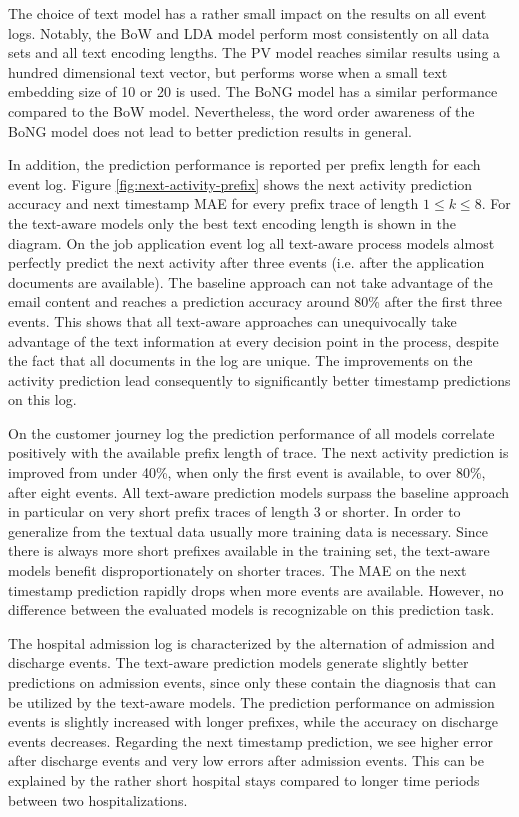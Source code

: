 The choice of text model has a rather small impact on the results on all event logs.
Notably, the BoW and LDA model perform most consistently on all data sets and all text encoding lengths.
The PV model reaches similar results using a hundred dimensional text vector, but performs worse when a small text embedding size of 10 or 20 is used.
The BoNG model has a similar performance compared to the BoW model.
Nevertheless, the word order awareness of the BoNG model does not lead to better prediction results in general.

In addition, the prediction performance is reported per prefix length for each event log.
Figure \ref{fig:next-activity-prefix} shows the next activity prediction accuracy and next timestamp MAE for every prefix trace of length $1 \leq k \leq 8$.
For the text-aware models only the best text encoding length is shown in the diagram.
On the job application event log all text-aware process models almost perfectly predict the next activity after three events (i.e. after the application documents are available).
The baseline approach can not take advantage of the email content and reaches a prediction accuracy around 80\% after the first three events.
This shows that all text-aware approaches can unequivocally take advantage of the text information at every decision point in the process, despite the fact that all documents in the log are unique.
The improvements on the activity prediction lead consequently to significantly better timestamp predictions on this log.

On the customer journey log the prediction performance of all models correlate positively with the available prefix length of trace.
The next activity prediction is improved from under 40\%, when only the first event is available, to over 80\%, after eight events.
All text-aware prediction models surpass the baseline approach in particular on very short prefix traces of length 3 or shorter.
In order to generalize from the textual data usually more training data is necessary.
Since there is always more short prefixes available in the training set, the text-aware models benefit disproportionately on shorter traces.
The MAE on the next timestamp prediction rapidly drops when more events are available.
However, no difference between the evaluated models is recognizable on this prediction task.

The hospital admission log is characterized by the alternation of admission and discharge events.
The text-aware prediction models generate slightly better predictions on admission events, since only these contain the diagnosis that can be utilized by the text-aware models.
The prediction performance on admission events is slightly increased with longer prefixes, while the accuracy on discharge events decreases.
Regarding the next timestamp prediction, we see higher error after discharge events and very low errors after admission events.
This can be explained by the rather short hospital stays compared to longer time periods between two hospitalizations.


